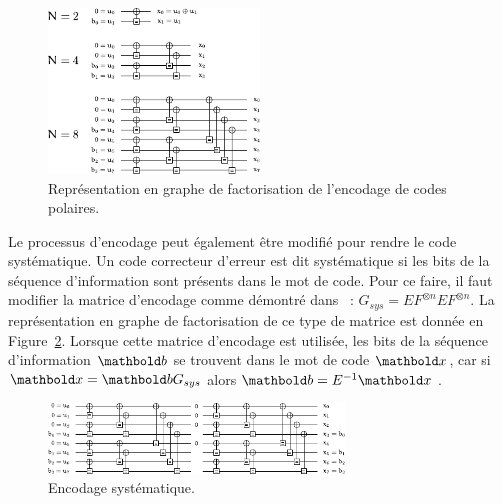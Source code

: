 \begin{figure}[t]
\centering
\includegraphics[width=0.5\textwidth]{main/ch1_fig/Graph_N_rec}
\caption{Représentation en graphe de factorisation de l'encodage de codes polaires.}
\label{fig:encodage}
\end{figure}

Le processus d'encodage peut également être modifié pour rendre le code systématique. Un code correcteur d'erreur est dit systématique si les bits de la séquence d'information sont présents dans le mot de code. Pour ce faire, il faut modifier la matrice d'encodage comme démontré dans~\cite{arikan_systematic_2011} : $G_{sys}=EF^{\otimes n}EF^{\otimes n}$. La représentation en graphe de factorisation de ce type de matrice est donnée en Figure~\ref{fig:sys}. Lorsque cette matrice d'encodage est utilisée, les bits de la séquence d'information $\mb{b}$ se trouvent dans le mot de code $\mb{x}$, car si $\mb{x}=\mb{b}G_{sys}$ alors $\mb{b}=E^{-1}\mb{x}$ .

\begin{figure}[t]
\centering
\includegraphics[width=0.7\textwidth]{main/ch1_fig/Graph_N_sys}
\caption{Encodage systématique.}
\label{fig:sys}
\end{figure}


